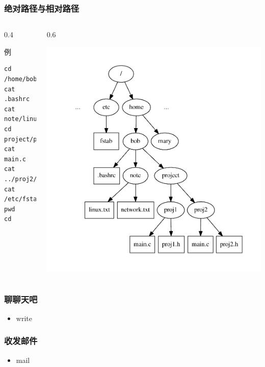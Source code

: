 \documentclass[xcolor=svgnames,bigger,presentation]{beamer}
\begin{document}
\begin{frame}[fragile]
\frametitle{绝对路径与相对路径}
\label{sec-4-2-14}
\begin{columns}
\begin{column}{0.4\textwidth}
\begin{block}{例}
\label{sec-4-2-14-1}


\begin{verbatim}
cd /home/bob
cat .bashrc
cat note/linux.txt
cd project/proj1
cat main.c
cat ../proj2/proj2.h
cat /etc/fstab
pwd
cd
\end{verbatim}
\end{block}
\end{column}
\begin{column}{0.6\textwidth}
\label{sec-4-2-14-2}

\includegraphics[width=.9\linewidth]{img/dirtree2.pdf}
\end{column}
\end{columns}
\end{frame}
\begin{frame}
\frametitle{聊聊天吧}
\label{sec-4-2-15}
\begin{itemize}

\item write
\label{sec-4-2-15-1}%
\end{itemize} %
\end{frame}
\begin{frame}
\frametitle{收发邮件}
\label{sec-4-2-16}
\begin{itemize}

\item mail
\label{sec-4-2-16-1}%
\end{itemize} %
\end{frame}
\end{document}
